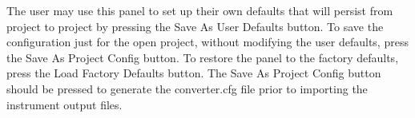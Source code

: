 The user may use this panel to set up their own defaults that will persist from project to project by pressing the Save As User Defaults button.  To save the configuration just for the open project, without modifying the user defaults, press the Save As Project Config button.  To restore the panel to the factory defaults, press the Load Factory Defaults button.  The Save As Project Config button should be pressed to generate the converter.cfg file prior to importing the instrument output files.



